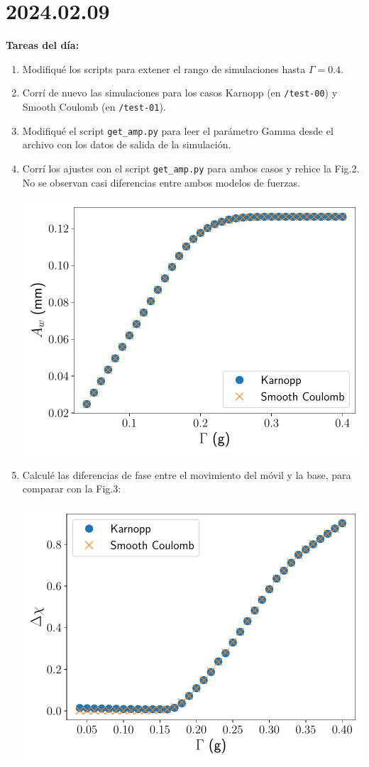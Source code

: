 \documentclass[11pt]{article}
\begin{document}
\section*{2024.02.09}
\textbf{Tareas del día:}
\begin{enumerate}
    \item Modifiqué los scripts para extener el rango de simulaciones hasta $\Gamma = 0.4$.
    \item Corrí de nuevo las simulaciones para los casos Karnopp (en \texttt{/test-00}) y Smooth Coulomb (en \texttt{/test-01}).
    \item Modifiqué el script \texttt{get\_amp.py} para leer el parámetro Gamma desde el archivo con los datos de salida de la simulación.
    \item Corrí los ajustes con el script \texttt{get\_amp.py} para ambos casos y rehice la Fig.2. No se observan casi diferencias entre ambos modelos de fuerzas.
        \begin{center}
            \includegraphics[scale=0.7]{figs/Fig_2_comp-1.pdf}
        \end{center}
    \item Calculé las diferencias de fase entre el movimiento del móvil y la base, para comparar con la Fig.3:
        \begin{center}
            \includegraphics[scale=0.7]{figs/Fig_3_comp.pdf}
        \end{center}
\end{enumerate}
\end{document}
